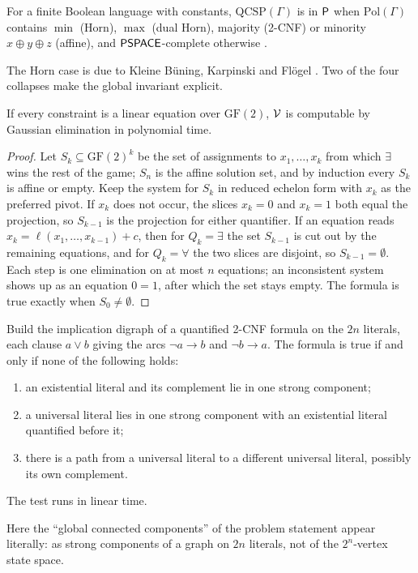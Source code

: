 \begin{theorem}\label{thm:schaefer}
For a finite Boolean language with constants, $\mathrm{QCSP}(\Gamma)$ is in $\mathsf{P}$ when $\mathrm{Pol}(\Gamma)$ contains $\min$ (Horn), $\max$ (dual Horn), majority (2-CNF) or minority $x\oplus y\oplus z$ (affine), and $\mathsf{PSPACE}$-complete otherwise \cite{SchaeferSAT,CKS01}.
\end{theorem}
The Horn case is due to Kleine B\"uning, Karpinski and Fl\"ogel \cite{KBKF}. Two of the four collapses make the global invariant explicit.

\begin{proposition}\label{prop:affine}
If every constraint is a linear equation over $\mathrm{GF}(2)$, $\mathcal{V}$ is computable by Gaussian elimination in polynomial time.
\end{proposition}
\begin{proof}
Let $S_k\subseteq\mathrm{GF}(2)^k$ be the set of assignments to $x_1,\dots,x_k$ from which $\exists$ wins the rest of the game; $S_n$ is the affine solution set, and by induction every $S_k$ is affine or empty. Keep the system for $S_k$ in reduced echelon form with $x_k$ as the preferred pivot. If $x_k$ does not occur, the slices $x_k=0$ and $x_k=1$ both equal the projection, so $S_{k-1}$ is the projection for either quantifier. If an equation reads $x_k=\ell(x_1,\dots,x_{k-1})+c$, then for $Q_k=\exists$ the set $S_{k-1}$ is cut out by the remaining equations, and for $Q_k=\forall$ the two slices are disjoint, so $S_{k-1}=\emptyset$. Each step is one elimination on at most $n$ equations; an inconsistent system shows up as an equation $0=1$, after which the set stays empty. The formula is true exactly when $S_0\ne\emptyset$.
\end{proof}

\begin{theorem}\label{thm:apt}
Build the implication digraph of a quantified 2-CNF formula on the $2n$ literals, each clause $a\lor b$ giving the arcs $\neg a\to b$ and $\neg b\to a$. The formula is true if and only if none of the following holds:
\begin{enumerate}[label=\textup{(\arabic*)}]
\item an existential literal and its complement lie in one strong component;
\item a universal literal lies in one strong component with an existential literal quantified before it;
\item there is a path from a universal literal to a different universal literal, possibly its own complement.
\end{enumerate}
The test runs in linear time.
\end{theorem}
Here the ``global connected components'' of the problem statement appear literally: as strong components of a graph on $2n$ literals, not of the $2^n$-vertex state space.

